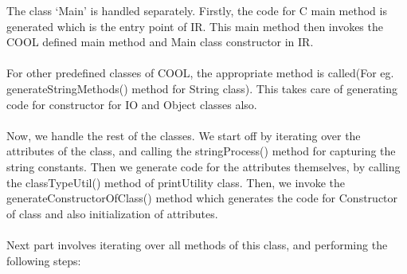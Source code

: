 \documentclass{article}
\begin{document}
The class ‘Main’ is handled separately. Firstly, the code for C main method is generated which is the entry point of IR. This main method then invokes the COOL defined main method and Main class constructor in IR. \\ \\
For other predefined classes of COOL, the appropriate method is called(For eg. generateStringMethods() method for String class). This takes care of generating code for constructor for IO and Object classes also. \\ \\
Now, we handle the rest of the classes. We start off by iterating over the attributes of the class, and calling the stringProcess() method for capturing the string constants. Then we generate code for the attributes themselves, by calling the classTypeUtil() method of printUtility class. Then, we invoke the generateConstructorOfClass() method which generates the code for Constructor of class and also initialization of attributes. \\ \\
Next part involves iterating over all methods of this class, and performing the following steps: 
\end{document}
